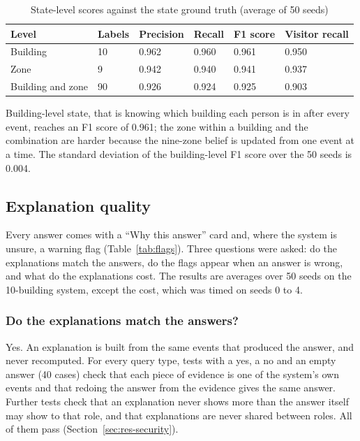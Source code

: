 \documentclass[12pt,a4paper,oneside]{report}
\begin{document}
\begin{table}[htbp]
\centering
\caption{State-level scores against the state ground truth (average of 50 seeds)}\label{tab:state}
{\small\setlength{\tabcolsep}{4pt}\renewcommand{\arraystretch}{1.2}
\begin{tabular}{|p{3.30cm}|p{1.74cm}|p{2.33cm}|p{1.94cm}|p{1.55cm}|p{2.52cm}|}\hline
\textbf{Level} & \textbf{Labels} & \textbf{Precision} & \textbf{Recall} & \textbf{F1 score} & \textbf{Visitor recall}\\\hline
Building & 10 & 0.962 & 0.960 & 0.961 & 0.950\\\hline
Zone & 9 & 0.942 & 0.940 & 0.941 & 0.937\\\hline
Building and zone & 90 & 0.926 & 0.924 & 0.925 & 0.903\\\hline
\end{tabular}}
\end{table}

Building-level state, that is knowing which building each person is in after every event, reaches an F1 score of 0.961; the zone within a building and the combination are harder because the nine-zone belief is updated from one event at a time. The standard deviation of the building-level F1 score over the 50 seeds is 0.004.

\subsection{Explanation quality}\label{sec:res-expl}
Every answer comes with a ``Why this answer'' card and, where the system is unsure, a warning flag (Table~\ref{tab:flags}). Three questions were asked: do the explanations match the answers, do the flags appear when an answer is wrong, and what do the explanations cost. The results are averages over 50 seeds on the 10-building system, except the cost, which was timed on seeds 0 to 4.

\subsubsection{Do the explanations match the answers?}
Yes. An explanation is built from the same events that produced the answer, and never recomputed. For every query type, tests with a yes, a no and an empty answer (40 cases) check that each piece of evidence is one of the system's own events and that redoing the answer from the evidence gives the same answer. Further tests check that an explanation never shows more than the answer itself may show to that role, and that explanations are never shared between roles. All of them pass (Section~\ref{sec:res-security}).
\end{document}
